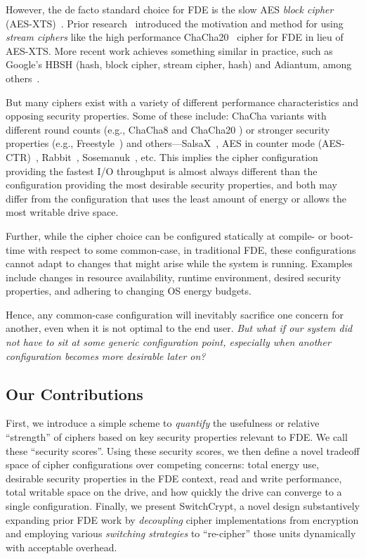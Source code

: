 However, the de facto standard choice for FDE is the slow AES \emph{block
cipher} (AES-XTS)~\cite{AES, AES-XTS}. Prior research~\cite{StrongBox}
introduced the motivation and method for using \emph{stream ciphers} like the
high performance ChaCha20~\cite{ChaCha20} cipher for FDE in lieu of AES-XTS.
More recent work achieves something similar in practice, such as Google's HBSH
(hash, block cipher, stream cipher, hash) and Adiantum, among others~\cite{HBSH,
Adiantum}.

But many ciphers exist with a variety of different performance characteristics
and opposing security properties. Some of these include: ChaCha variants with
different round counts (e.g., ChaCha8 \cite{ChaCha8} and ChaCha20
\cite{ChaCha20}) or stronger security properties (e.g.,
Freestyle~\cite{Freestyle}) and others---SalsaX~\cite{SalsaX}, AES in counter
mode (AES-CTR)~\cite{AES-CTR}, Rabbit~\cite{Rabbit}, Sosemanuk~\cite{Sosemanuk},
etc. This implies the cipher configuration providing the fastest I/O throughput
is almost always different than the configuration providing the most desirable
security properties, and both may differ from the configuration that uses the
least amount of energy or allows the most writable drive space.

Further, while the cipher choice can be configured statically at compile- or
boot-time with respect to some common-case, in traditional FDE, these
configurations cannot adapt to changes that might arise while the system is
running. Examples include changes in resource availability, runtime environment,
desired security properties, and adhering to changing OS energy budgets.

Hence, any common-case configuration will inevitably sacrifice one concern for
another, even when it is not optimal to the end user. \emph{But what if our
system did not have to sit at some generic configuration point, especially when
another configuration becomes more desirable later on?}

\subsection{Our Contributions}

First, we introduce a simple scheme to \emph{quantify} the usefulness or
relative ``strength'' of ciphers based on key security properties relevant to
FDE. We call these ``security scores''. Using these security scores, we then
define a novel tradeoff space of cipher configurations over competing concerns:
total energy use, desirable security properties in the FDE context, read and
write performance, total writable space on the drive, and how quickly the drive
can converge to a single configuration. Finally, we present SwitchCrypt, a novel
design substantively expanding prior FDE work by \emph{decoupling} cipher
implementations from encryption and employing various \emph{switching
strategies} to ``re-cipher'' those units dynamically with acceptable overhead.

